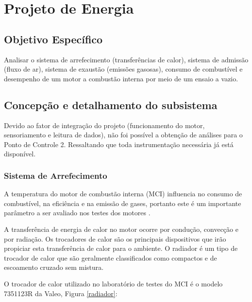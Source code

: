 \chapter[Projeto de Energia]{Projeto de Energia}

\section{Objetivo Específico}

Analisar o sistema de arrefecimento (transferências de calor), sistema de admissão (fluxo de ar), sistema de exaustão (emissões gasosas), consumo de combustível e desempenho de um motor a combustão interna por meio de um ensaio a vazio.

\section{Concepção e detalhamento do subsistema}

Devido ao fator de integração do projeto (funcionamento do motor, sensoriamento e leitura de dados), não foi possível a obtenção de análises para o Ponto de Controle 2. Ressaltando que toda instrumentação necessária já está disponível.

\subsection{Sistema de Arrefecimento}

A temperatura do motor de combustão interna (MCI) influencia no consumo de combustível, na eficiência e na emissão de gases, portanto este é um importante parâmetro a ser avaliado nos testes dos motores \cite{kuntzer15}.

A transferência de energia de calor no motor ocorre por condução, convecção e por radiação. Os trocadores de calor são os principais dispositivos que irão propiciar esta transferência de calor para o ambiente. O radiador é um tipo de trocador de calor que são geralmente classificados como compactos e de escoamento cruzado sem mistura.

O trocador de calor utilizado no laboratório de testes do MCI é o modelo 7351123R da Valeo, Figura \ref{radiador}:

